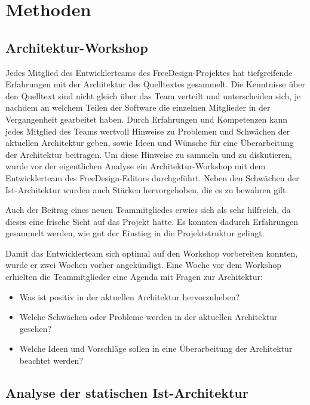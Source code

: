 \chapter{Methoden}

\section{Architektur-Workshop}
Jedes Mitglied des Entwicklerteams des FreeDesign-Projektes hat tiefgreifende Erfahrungen mit der Architektur des Quelltextes gesammelt. 
Die Kenntnisse über den Quelltext sind nicht gleich über das Team verteilt und unterscheiden sich, je nachdem an welchem Teilen der Software die einzelnen Mitglieder in der Vergangenheit gearbeitet haben.
Durch Erfahrungen und Kompetenzen kann jedes Mitglied des Teams wertvoll Hinweise zu Problemen und Schwächen der aktuellen Architektur geben, sowie Ideen und Wünsche für eine Überarbeitung der Architektur beitragen.
Um diese Hinweise zu sammeln und zu diskutieren, wurde vor der eigentlichen Analyse ein Architektur-Workshop mit dem Entwicklerteam des FreeDesign-Editors durchgeführt. Neben den Schwächen der Ist-Architektur wurden auch Stärken hervorgehoben, die es zu bewahren gilt.

Auch der Beitrag eines neuen Teammitgliedes erwies sich als sehr hilfreich, da dieses eine frische Sicht auf das Projekt hatte. Es konnten dadurch Erfahrungen gesammelt werden, wie gut der Einstieg in die Projektstruktur gelingt. 

Damit das Entwicklerteam sich optimal auf den Workshop vorbereiten konnten, wurde er zwei Wochen vorher angekündigt. Eine Woche vor dem Workshop erhielten die Teammitglieder eine Agenda mit Fragen zur Architektur:
\begin{itemize}
	\item Was ist positiv in der aktuellen Architektur hervorzuheben?
	\item Welche Schwächen oder Probleme werden in der aktuellen Architektur gesehen?
	\item Welche Ideen und Vorschläge sollen in eine Überarbeitung der Architektur beachtet werden?
\end{itemize}


\section{Analyse der statischen Ist-Architektur}
